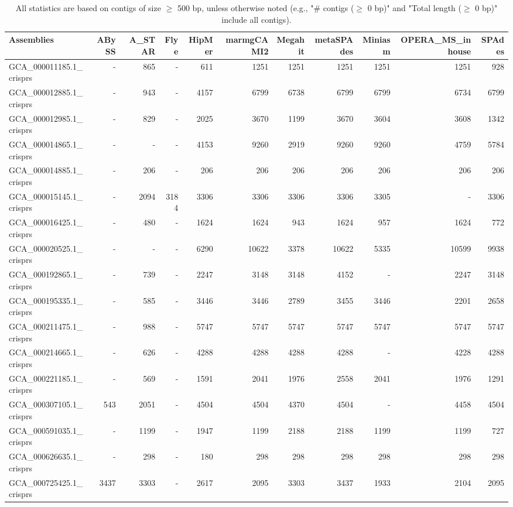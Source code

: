 \documentclass[12pt,a4paper]{article}
\begin{document}
\begin{table}[ht]
\begin{center}
\caption{All statistics are based on contigs of size $\geq$ 500 bp, unless otherwise noted (e.g., "\# contigs ($\geq$ 0 bp)" and "Total length ($\geq$ 0 bp)" include all contigs).}
\begin{tabular}{|l*{10}{|r}|}
\hline
Assemblies & ABySS & A\_STAR & Flye & HipMer & marmgCAMI2 & Megahit & metaSPAdes & Miniasm & OPERA\_MS\_inhouse & SPAdes \\ \hline
GCA\_000011185.1\_crisprs & - & 865 & - & 611 & 1251 & 1251 & 1251 & 1251 & 1251 & 928 \\ \hline
GCA\_000012885.1\_crisprs & - & 943 & - & 4157 & 6799 & 6738 & 6799 & 6799 & 6734 & 6799 \\ \hline
GCA\_000012985.1\_crisprs & - & 829 & - & 2025 & 3670 & 1199 & 3670 & 3604 & 3608 & 1342 \\ \hline
GCA\_000014865.1\_crisprs & - & - & - & 4153 & 9260 & 2919 & 9260 & 9260 & 4759 & 5784 \\ \hline
GCA\_000014885.1\_crisprs & - & 206 & - & 206 & 206 & 206 & 206 & 206 & 206 & 206 \\ \hline
GCA\_000015145.1\_crisprs & - & 2094 & 3184 & 3306 & 3306 & 3306 & 3306 & 3305 & - & 3306 \\ \hline
GCA\_000016425.1\_crisprs & - & 480 & - & 1624 & 1624 & 943 & 1624 & 957 & 1624 & 772 \\ \hline
GCA\_000020525.1\_crisprs & - & - & - & 6290 & 10622 & 3378 & 10622 & 5335 & 10599 & 9938 \\ \hline
GCA\_000192865.1\_crisprs & - & 739 & - & 2247 & 3148 & 3148 & 4152 & - & 2247 & 3148 \\ \hline
GCA\_000195335.1\_crisprs & - & 585 & - & 3446 & 3446 & 2789 & 3455 & 3446 & 2201 & 2658 \\ \hline
GCA\_000211475.1\_crisprs & - & 988 & - & 5747 & 5747 & 5747 & 5747 & 5747 & 5747 & 5747 \\ \hline
GCA\_000214665.1\_crisprs & - & 626 & - & 4288 & 4288 & 4288 & 4288 & - & 4228 & 4288 \\ \hline
GCA\_000221185.1\_crisprs & - & 569 & - & 1591 & 2041 & 1976 & 2558 & 2041 & 1976 & 1291 \\ \hline
GCA\_000307105.1\_crisprs & 543 & 2051 & - & 4504 & 4504 & 4370 & 4504 & - & 4458 & 4504 \\ \hline
GCA\_000591035.1\_crisprs & - & 1199 & - & 1947 & 1199 & 2188 & 2188 & 1199 & 1199 & 727 \\ \hline
GCA\_000626635.1\_crisprs & - & 298 & - & 180 & 298 & 298 & 298 & 298 & 298 & 298 \\ \hline
GCA\_000725425.1\_crisprs & 3437 & 3303 & - & 2617 & 2095 & 3303 & 3437 & 1933 & 2104 & 2095 \\ \hline
\end{tabular}
\end{center}
\end{table}
\end{document}
